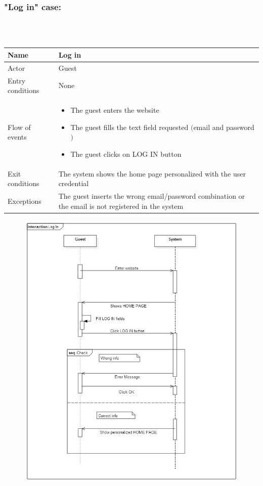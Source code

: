 \subsubsection{"Log in" case:}
\hfill \\
\\
\begin{tabular}{|p{3cm}|p{10cm}|}
\hline
Name & Log in\\
\hline
Actor & Guest\\
\hline
Entry conditions & None\\
\hline
Flow of events & \begin{itemize}
					\item The guest enters the website
					\item The guest fills the text field requested $($email and password$)$
					\item The guest clicks on LOG IN button
				\end{itemize}\\
\hline
Exit conditions & The system shows the home page personalized with the user credential\\
\hline
Exceptions & The guest inserts the wrong email/password combination or the email is not registered in the system\\
\hline
\end {tabular}
\newpage
\begin{figure}[h!]
	\centering
	\includegraphics[height=0.85\textheight]{"myTaxiServiceImg/SequenceDiagram/Log In"}
\end{figure}

